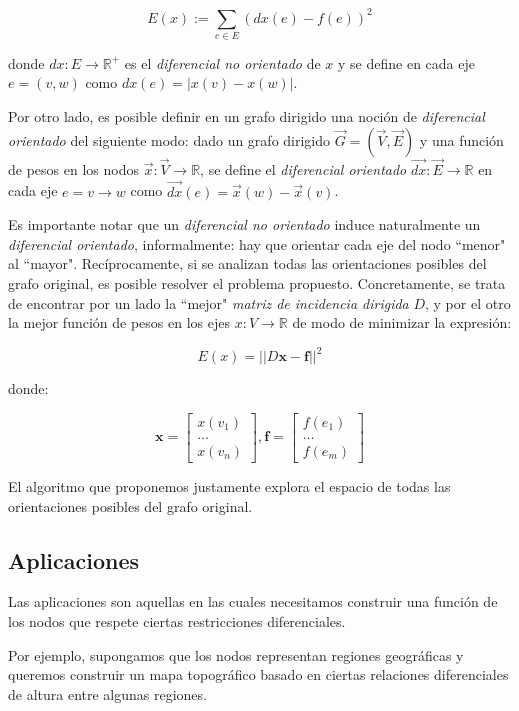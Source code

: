 \documentclass[10pt, a4paper, twocolumn]{article} %
\begin{document}
$$E(x) := \sum_{e \in E} (dx(e) - f(e))^2$$

donde $dx: E \rightarrow \mathbb{R}^+$ es el \textit{diferencial 
no orientado} de $x$ y se define en cada eje $e=(v,w)$ como $dx(e) = 
|x(v) - x(w)|$.

\smallskip

Por otro lado, es posible definir en un grafo dirigido una noción de 
\textit{diferencial orientado} del siguiente modo: dado un grafo 
dirigido $\vec G=(\vec V,\vec E)$ y una función de pesos en los nodos 
$\vec x: \vec V \rightarrow \mathbb{R}$, se define el 
\textit{diferencial orientado} $\vec{dx}: \vec E \rightarrow \mathbb{R}$ 
en cada eje $e=v \rightarrow w$ como $\vec{dx}(e) = \vec x(w) - 
\vec x(v)$.

Es importante notar que un \textit{diferencial no orientado} induce 
naturalmente un \textit{diferencial orientado}, informalmente: hay que 
orientar cada eje del nodo ``menor" al ``mayor". Recíprocamente, si
se analizan todas las orientaciones posibles del grafo original, es 
posible resolver el problema propuesto. Concretamente, se trata de 
encontrar por un lado la ``mejor" \textit{matriz de incidencia 
dirigida} $D$, y por el otro la mejor función de pesos en 
los ejes $x: V \rightarrow \mathbb{R}$ de modo de minimizar la 
expresión:

$$E(x) = ||D\bm{x}-\bm{f}||^2$$

donde:

$$
\bm{x} = 
\begin{bmatrix}
	x(v_1)\\
	\dots \\
	x(v_n)
\end{bmatrix}, 
\bm{f} = 
\begin{bmatrix}
	f(e_1)\\
	\dots \\
	f(e_m)
\end{bmatrix}
$$

El algoritmo que proponemos justamente explora el espacio de todas las 
orientaciones posibles del grafo original.

\subsection{Aplicaciones}

Las aplicaciones son aquellas en las cuales necesitamos construir una 
función de los nodos que respete ciertas restricciones diferenciales.

Por ejemplo, supongamos que los nodos representan regiones geográficas 
y queremos construir un mapa topográfico basado en ciertas relaciones 
diferenciales de altura entre algunas regiones.
\end{document}
